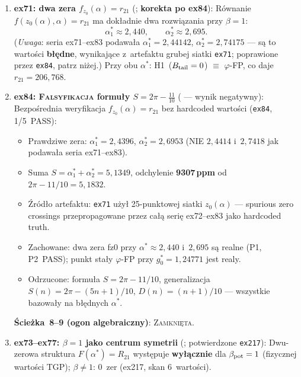 \begin{remark}
\begin{enumerate}[nosep]
  \item \textbf{ex71: dwa zera $f_{z_0}(\alpha)=r_{21}$}
    (; \textbf{korekta po ex84}):
    R\'ownanie $f(z_0(\alpha),\alpha) = r_{21}$ ma dok\l{}adnie dwa
    rozwi\k{a}zania przy $\beta=1$:
    \[
      \alpha_1^* \approx 2{,}440, \qquad \alpha_2^* \approx 2{,}695.
    \]
    (\emph{Uwaga}: seria ex71--ex83 podawa\l{}a $\alpha_1^*=2{,}44142$,
    $\alpha_2^*=2{,}74175$ --- s\k{a} to warto\'sci \textbf{b\l{}\k{e}dne},
    wynikaj\k{a}ce z~artefaktu grubej siatki \texttt{ex71};
    poprawione przez \texttt{ex84}, patrz ni\.zej.)
    Przy obu $\alpha^*$: H1~($B_{\rm tail}=0$) $\equiv$ $\varphi$-FP,
    co daje $r_{21}=206{,}768$.
  \item \textbf{ex84: \textsc{Falsyfikacja} formu\l{}y $S=2\pi-\tfrac{11}{10}$}
    ( --- wynik negatywny):
    Bezpo\'srednia weryfikacja $f_{z_0}(\alpha) = r_{21}$
    bez hardcoded warto\'sci (\texttt{ex84}, 1/5~PASS):
    \begin{itemize}[nosep]
      \item Prawdziwe zera: $\alpha_1^* = 2{,}4396$, $\alpha_2^* = 2{,}6953$
        (NIE $2{,}4414$ i~$2{,}7418$ jak podawa\l{}a seria ex71--ex83).
      \item Suma $S = \alpha_1^*+\alpha_2^* = 5{,}1349$,
        odchylenie \textbf{9307\,ppm} od $2\pi-11/10 = 5{,}1832$.
      \item \'{Z}r\'od\l{}o artefaktu: \texttt{ex71} u\.zy\l{} 25-punktowej siatki
        $z_0(\alpha)$ --- spurious zero crossings przepropagowane
        przez ca\l\k{a} seri\k{e} ex72--ex83 jako hardcoded truth.
      \item Zachowane: dwa zera fz0 przy $\alpha^*\approx 2{,}440$ i~$2{,}695$
        s\k{a} realne (P1, P2~PASS); punkt sta\l{}y $\varphi$-FP przy
        $g_0^*=1{,}24771$ jest realy.
      \item Odrzucone: formu\l{}a $S=2\pi{-}11/10$,
        generalizacja $S(n)=2\pi{-}(5n+1)/10$,
        $D(n)=(n+1)/10$ --- wszystkie bazowa\l{}y na b\l{}\k{e}dnych $\alpha^*$.
    \end{itemize}
    \textbf{\'Scie\.zka~8--9 (ogon algebraiczny)}: \textsc{Zamkni\k{e}ta}.
  \item \textbf{ex73--ex77: $\beta=1$ jako centrum symetrii}
    (; potwierdzone \texttt{ex217}):
    Dwu-zerowa struktura $F(\alpha^*)=R_{21}$ wyst\k{e}puje
    \textbf{wy\l{}\k{a}cznie} dla $\beta_{\rm pot}=1$ (fizycznej warto\'sci TGP);
    $\beta\neq1$: 0~zer (ex217, skan 6~warto\'sci).

\end{enumerate}
\end{remark}
